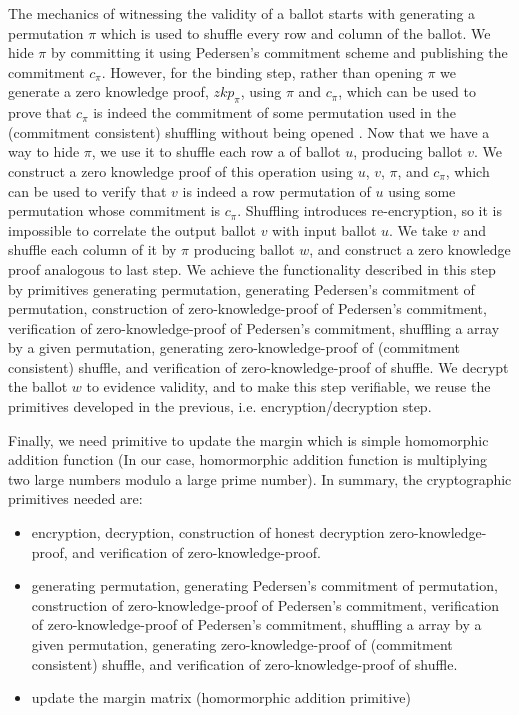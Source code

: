 \documentclass{llncs}
\begin{document}
The mechanics of witnessing the validity of a ballot starts with generating a 
permutation $\pi$ which is used to shuffle every row and column of the ballot.
We hide $\pi$ by committing it using Pedersen's 
commitment scheme 
and publishing  the commitment $c_{\pi}$. However, for the binding step, rather 
than opening $\pi$ we generate a zero knowledge proof, $zkp_{\pi}$, 
using $\pi$ and $c_{\pi}$, which can 
be  used to prove that $c_{\pi}$ is indeed the commitment of some permutation
used in the (commitment consistent) shuffling 
 without being opened \cite{Wikstrom:2009:CPS}. Now that we have a way 
 to hide $\pi$, we use it to shuffle each row a of 
ballot $u$, producing ballot $v$. We construct a zero knowledge proof 
of this operation using $u$, $v$, $\pi$, and $c_{\pi}$, which can be used 
to verify that $v$ is indeed a row permutation of $u$ using some permutation 
whose commitment is $c_{\pi}$. Shuffling 
introduces re-encryption, so it is impossible to correlate the output
ballot $v$ with input ballot $u$.  We take $v$ and shuffle each column of it 
by $\pi$ producing ballot $w$, and construct a zero knowledge proof 
analogous to last step. We achieve the functionality described in this step
by primitives 
generating permutation, generating  Pedersen's 
commitment of permutation, construction of 
zero-knowledge-proof of Pedersen's commitment, verification of 
zero-knowledge-proof of Pedersen's commitment, shuffling a array 
by a given permutation, 
generating zero-knowledge-proof of (commitment consistent) shuffle, 
and verification of zero-knowledge-proof of shuffle.
We decrypt the ballot $w$ to evidence validity, and to make this step
 verifiable, we reuse the primitives developed in the
 previous, i.e. encryption/decryption step.


Finally, we need primitive to update the margin which is simple homomorphic
addition function (In our case, homormorphic 
 addition function is multiplying two large numbers modulo a large prime 
 number).
In summary, the cryptographic primitives needed are: 
\begin{itemize} 
\item encryption, decryption, construction of honest decryption
     zero-knowledge-proof, and verification of zero-knowledge-proof. 
\item generating permutation, generating  Pedersen's 
     commitment of permutation, construction of 
     zero-knowledge-proof of Pedersen's commitment, verification of 
     zero-knowledge-proof of Pedersen's commitment, shuffling a array 
     by a given permutation, 
     generating zero-knowledge-proof of (commitment consistent) shuffle, 
     and verification of zero-knowledge-proof of shuffle.
\item  update the margin matrix (homormorphic addition primitive)
\end{itemize}
\end{document}
